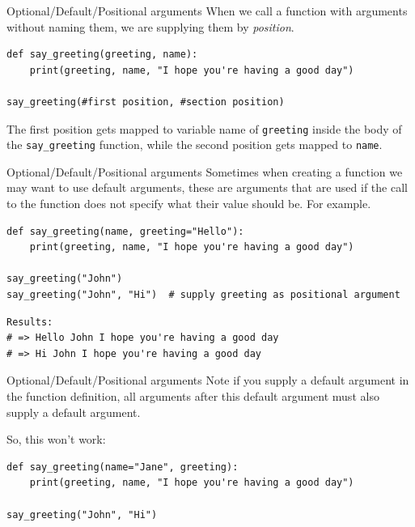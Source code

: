 \documentclass[10pt]{beamer}
\begin{document}
\begin{frame}[label={sec:org774747f},fragile]{Optional/Default/Positional arguments}
 When we call a function with arguments without naming them, we are supplying them by
\emph{position}.

\begin{verbatim}
def say_greeting(greeting, name):
    print(greeting, name, "I hope you're having a good day")

say_greeting(#first position, #section position)
\end{verbatim}

The first position gets mapped to variable name of \texttt{greeting} inside the body of the
\texttt{say\_greeting} function, while the second position gets mapped to \texttt{name}. 
\end{frame}

\begin{frame}[label={sec:org1868350},fragile]{Optional/Default/Positional arguments}
 Sometimes when creating a function we may want to use default arguments, these are
arguments that are used if the call to the function does not specify what their value
should be. For example.

\begin{verbatim}
def say_greeting(name, greeting="Hello"):
    print(greeting, name, "I hope you're having a good day")

say_greeting("John")
say_greeting("John", "Hi")  # supply greeting as positional argument
\end{verbatim}

\begin{verbatim}
Results: 
# => Hello John I hope you're having a good day
# => Hi John I hope you're having a good day
\end{verbatim}
\end{frame}

\begin{frame}[label={sec:org70bf023},fragile]{Optional/Default/Positional arguments}
 \alert{Note} if you supply a default argument in the function definition, all arguments after
this default argument must also supply a default argument.

So, this \alert{won't} work:

\begin{verbatim}
def say_greeting(name="Jane", greeting):
    print(greeting, name, "I hope you're having a good day")

say_greeting("John", "Hi")
\end{verbatim}
\end{frame}
\end{document}
